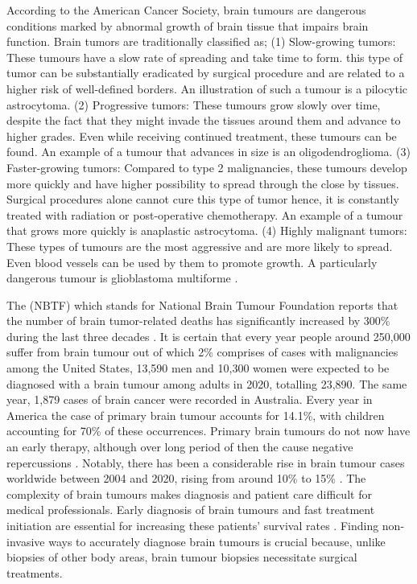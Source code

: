 \documentclass[12pt, a4paper,twoside]{report}
\theoremstyle{plain} %
\theoremstyle{definition} %
\theoremstyle{remark} %
\numberwithin{equation}{chapter}
\begin{document}
According to the American Cancer Society, brain tumours are dangerous conditions marked by abnormal growth of brain tissue that impairs brain function. Brain tumors are traditionally classified as; (1) Slow-growing tumors: These tumours have a slow rate of spreading and take time to form. 
this type of tumor can be substantially eradicated by surgical procedure and are related to a higher risk of well-defined borders. An illustration of such a tumour is a pilocytic astrocytoma. (2) Progressive tumors: These tumours grow slowly over time, despite the fact that they might invade the tissues around them and advance to higher grades. Even while receiving continued treatment, these tumours can be found. An example of a tumour that advances in size is an oligodendroglioma. (3) Faster-growing tumors: Compared to type 2 malignancies, these tumours develop more quickly and have higher possibility to spread through the close by tissues. Surgical procedures alone cannot cure this type of tumor hence, it is constantly treated with radiation or post-operative chemotherapy. An example of a tumour that grows more quickly is anaplastic astrocytoma. (4) Highly malignant tumors: These types of tumours are the most aggressive and are more likely to spread. Even blood vessels can be used by them to promote growth. A particularly dangerous tumour is glioblastoma multiforme \cite{lundervold19}.

The (NBTF) which stands for National Brain Tumour Foundation reports that the number of brain tumor-related deaths has significantly increased by 300\% during the last three decades \cite{el14}. It is certain that every year  people around 250,000 suffer from brain tumour out of which 2\% comprises of cases with malignancies \cite{tiwari22} among the United States, 13,590 men and 10,300 women were expected to be diagnosed with a brain tumour among adults in 2020, totalling 23,890. The same year, 1,879 cases of brain cancer were recorded in Australia. Every year in America the case of primary brain tumour accounts for 14.1\%, with children accounting for 70\% of these occurrences. Primary brain tumours do not now have an early therapy, although over long period of then the cause negative repercussions \cite{anaya22}. Notably, there has been a considerable rise in brain tumour cases worldwide between 2004 and 2020, rising from around 10\% to 15\% \cite{xie22}. The complexity of brain tumours makes diagnosis and patient care difficult for medical professionals. Early diagnosis of brain tumours and fast treatment initiation are essential for increasing these patients' survival rates \cite{mcfaline22}. Finding non-invasive ways to accurately diagnose brain tumours is crucial because, unlike biopsies of other body areas, brain tumour biopsies necessitate surgical treatments. 
\end{document}
